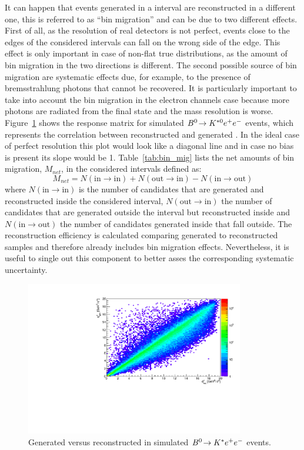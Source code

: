 It can happen that events generated in a \qsq interval are reconstructed in a different one,
this is referred to as ``bin migration'' and can be due to two different effects.
First of all, as the resolution of real detectors is not perfect, events close to the edges
of the considered intervals can fall on the wrong side of the edge. This effect is only important
in case of non-flat true distributions, as the amount of bin migration in the two directions is different.
The second possible source of bin migration are systematic effects due, for example,
to the presence of bremsstrahlung photons that cannot be recovered.
It is particularly important to take into account the bin migration in the electron channels case 
because more photons are radiated from the final state and the mass resolution is worse.
Figure~\ref{fig:ee_bin_mig} shows the response matrix for simulated ${{B}^0}\!\rightarrow {\ensuremath{{K}^{*0}}}e^+ e^-$ events,
which represents the correlation between reconstructed and generated \qsq. In the ideal case of
perfect resolution this plot would look like a diagonal line and in case no bias is present
its slope would be 1. Table~\ref{tab:bin_mig} lists the net amounts of bin migration, $M_{net}$, 
in the considered \qsq intervals defined as:
%
\begin{equation}
M_{net} = N(\text{in} \to \text{in}) + N(\text{out} \to \text{in}) - N(\text{in} \to \text{out}) 
\end{equation}
%
\noindent
where $N(\text{in} \to \text{in})$ is the number of candidates that are generated and
reconstructed inside the considered interval, $N(\text{out} \to \text{in})$ the number of 
candidates that are generated outside the interval but reconstructed inside and
$N(\text{in} \to \text{out})$ the number of candidates generated inside that fall outside.
The reconstruction efficiency is calculated comparing generated to reconstructed samples
and therefore already includes bin migration effects. Nevertheless, it is useful to single
out this component to better asses the corresponding systematic uncertainty.
%
\begin{figure}[h!]
\centering
\includegraphics[width=0.85\textwidth]{RKst/figs/bin_mig.pdf}
\caption{Generated versus reconstructed \qsq in simulated ${{B}^0}\!\rightarrow {\ensuremath{{K}^*}}e^+ e^-$ events.}
\label{fig:ee_bin_mig}
\end{figure}
